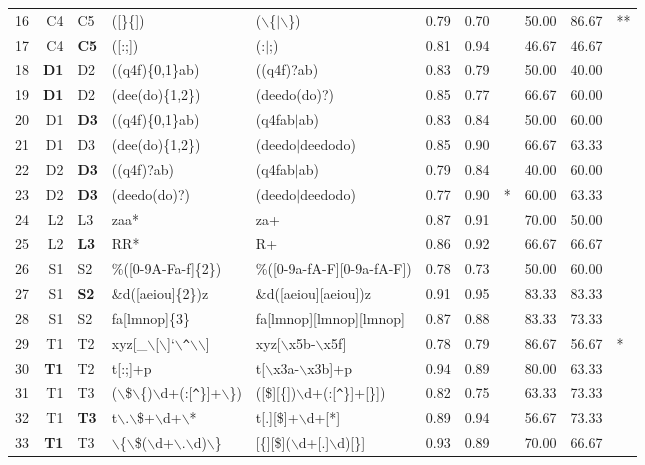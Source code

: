 \begin{table*}[ht]
\begin{tabular}{rr@{ -- }lllrrlrrl}
  16 & C4 & C5 & ([\}\{]) & ($\backslash$\{$|$$\backslash$\}) & 0.79 & 0.70 &   & 50.00 & 86.67 & ** \\ 
  17 & C4 & {\bf C5} & ([:;]) & (:$|$;) & 0.81 & 0.94 &   & 46.67 & 46.67 &   \\ 
  \hline
  18 & {\bf D1} & D2 & ((q4f)\{0,1\}ab) & ((q4f)?ab) & 0.83 & 0.79 &   & 50.00 & 40.00 &   \\ 
  19 & {\bf D1} & D2 & (dee(do)\{1,2\}) & (deedo(do)?) & 0.85 & 0.77 &   & 66.67 & 60.00 &   \\ 
  20 & D1 & {\bf D3} & ((q4f)\{0,1\}ab) & (q4fab$|$ab) & 0.83 & 0.84 &   & 50.00 & 60.00 &   \\ 
  21 & D1 & D3 & (dee(do)\{1,2\}) & (deedo$|$deedodo) & 0.85 & 0.90 &   & 66.67 & 63.33 &   \\ 

  22 & D2 & {\bf D3} & ((q4f)?ab) & (q4fab$|$ab) & 0.79 & 0.84 &   & 40.00 & 60.00 &   \\ 
  23 & D2 & {\bf D3} & (deedo(do)?) & (deedo$|$deedodo) & 0.77 & 0.90 & * & 60.00 & 63.33 &   \\ 
  \hline
  24 & L2 & L3 & zaa* & za+ & 0.87 & 0.91 &   & 70.00 & 50.00 &   \\ 
  25 & L2 & {\bf L3} & RR* & R+ & 0.86 & 0.92 &   & 66.67 & 66.67 &   \\ 
  \hline
  26 & S1 & S2 & \%([0-9A-Fa-f]\{2\}) & \%([0-9a-fA-F][0-9a-fA-F]) & 0.78 & 0.73 &   & 50.00 & 60.00 &   \\ 
  27 & S1 & {\bf S2} & \&d([aeiou]\{2\})z & \&d([aeiou][aeiou])z & 0.91 & 0.95 &   & 83.33 & 83.33 &   \\ 
  28 & S1 & S2 & fa[lmnop]\{3\} & fa[lmnop][lmnop][lmnop] & 0.87 & 0.88 &   & 83.33 & 73.33 &   \\ 
  \hline
  29 & T1 & T2 & xyz[\_$\backslash$[$\backslash$]`$\backslash$\verb|^|$\backslash$$\backslash$] & xyz[$\backslash$x5b-$\backslash$x5f] & 0.78 & 0.79 &   & 86.67 & 56.67 & * \\ 
  30 & {\bf T1} & T2 & t[:;]+p & t[$\backslash$x3a-$\backslash$x3b]+p & 0.94 & 0.89 &   & 80.00 & 63.33 &   \\ 
  
  31 & T1 & T3 & ($\backslash$\$$\backslash$\{)$\backslash$d+(:[\verb|^|\}]+$\backslash$\}) & ([\$][\{])$\backslash$d+(:[\verb|^|\}]+[\}]) & 0.82 & 0.75 &   & 63.33 & 73.33 &   \\ 
  32 & T1 & {\bf T3} & t$\backslash$.$\backslash$\$+$\backslash$d+$\backslash$* & t[.][\$]+$\backslash$d+[*] & 0.89 & 0.94 &   & 56.67 & 73.33 &   \\ 
  33 & {\bf T1} & T3 & $\backslash$\{$\backslash$\$($\backslash$d+$\backslash$.$\backslash$d)$\backslash$\} & [\{][\$]($\backslash$d+[.]$\backslash$d)[\}] & 0.93 & 0.89 &   & 70.00 & 66.67 &   \\ 
  

\end{tabular}
\end{table*}
